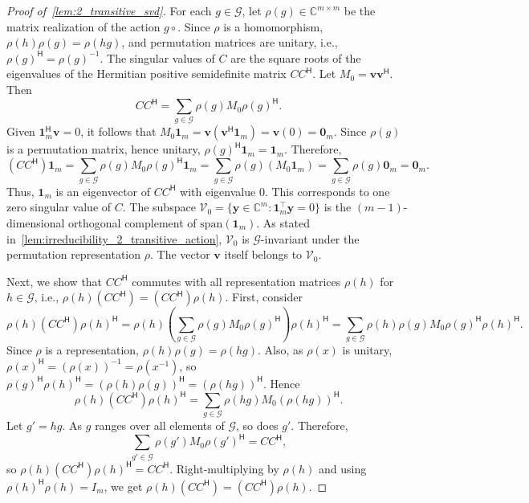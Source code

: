 \documentclass[11pt]{article}
\begin{document}
\begin{proof}[Proof of~\cref{lem:2_transitive_svd}]
For each \(g\in \mathcal G\), let \(\rho(g)\in\mathbb{C}^{m\times m}\) be the matrix realization of the action \(g\circ\). Since \(\rho\) is a homomorphism, \(\rho(h)\rho(g)=\rho(hg)\), and permutation matrices are unitary, i.e., \(\rho(g)^{\mathsf H}=\rho(g)^{-1}\). The singular values of \(C\) are the square roots of the eigenvalues of the Hermitian positive semidefinite matrix \(CC^{\mathsf H}\). Let \(M_0 = \boldsymbol{v}\boldsymbol{v}^{\mathsf H}\). Then
\[
CC^{\mathsf H} = \sum_{g \in \mathcal G} \rho(g) M_0 \rho(g)^{\mathsf H}.
\]
Given \(\boldsymbol{1}_m^{\mathsf H} \boldsymbol{v} = 0\), it follows that \(M_0 \boldsymbol{1}_m = \boldsymbol{v}(\boldsymbol{v}^{\mathsf H} \boldsymbol{1}_m) = \boldsymbol{v}(0) = \boldsymbol{0}_m\). Since \(\rho(g)\) is a permutation matrix, hence unitary, \(\rho(g)^{\mathsf H} \boldsymbol{1}_m = \boldsymbol{1}_m\). Therefore,
\[
(CC^{\mathsf H})\boldsymbol{1}_m
= \sum_{g \in \mathcal G} \rho(g) M_0 \rho(g)^{\mathsf H} \boldsymbol{1}_m
= \sum_{g \in \mathcal G} \rho(g) (M_0 \boldsymbol{1}_m)
= \sum_{g \in \mathcal G} \rho(g)\boldsymbol{0}_m
= \boldsymbol{0}_m.
\]
Thus, \(\boldsymbol{1}_m\) is an eigenvector of \(CC^{\mathsf H}\) with eigenvalue \(0\). This corresponds to one zero singular value of \(C\).
The subspace \(\mathcal V_0 = \{\boldsymbol{y} \in \mathbb{C}^m : \boldsymbol{1}_m^{\top}\boldsymbol{y} = 0\}\) is the \((m-1)\)-dimensional orthogonal complement of \(\mathrm{span}(\boldsymbol{1}_m)\). As stated in~\cref{lem:irreducibility_2_transitive_action}, \(\mathcal V_0\) is \(\mathcal G\)-invariant under the permutation representation \(\rho\). The vector \(\boldsymbol{v}\) itself belongs to \(\mathcal V_0\).

Next, we show that \(CC^{\mathsf H}\) commutes with all representation matrices \(\rho(h)\) for \(h \in \mathcal G\), i.e., \(\rho(h)(CC^{\mathsf H}) = (CC^{\mathsf H})\rho(h)\). First, consider
\[
\rho(h)(CC^{\mathsf H}) \rho(h)^{\mathsf H}
= \rho(h)\left(\sum_{g \in \mathcal G} \rho(g) M_0 \rho(g)^{\mathsf H}\right)\rho(h)^{\mathsf H}
= \sum_{g \in \mathcal G} \rho(h)\rho(g) M_0 \rho(g)^{\mathsf H}\rho(h)^{\mathsf H}.
\]
Since \(\rho\) is a representation, \(\rho(h)\rho(g) = \rho(hg)\). Also, as \(\rho(x)\) is unitary, \(\rho(x)^{\mathsf H} = (\rho(x))^{-1} = \rho(x^{-1})\), so \(\rho(g)^{\mathsf H}\rho(h)^{\mathsf H} = (\rho(h)\rho(g))^{\mathsf H} = (\rho(hg))^{\mathsf H}\). Hence
\[
\rho(h)(CC^{\mathsf H}) \rho(h)^{\mathsf H}
= \sum_{g \in \mathcal G} \rho(hg) M_0 (\rho(hg))^{\mathsf H}.
\]
Let \(g' = hg\). As \(g\) ranges over all elements of \(\mathcal G\), so does \(g'\). Therefore,
\[
\sum_{g' \in \mathcal G} \rho(g') M_0 \rho(g')^{\mathsf H} = CC^{\mathsf H},
\]
so \(\rho(h)(CC^{\mathsf H}) \rho(h)^{\mathsf H} = CC^{\mathsf H}\). Right-multiplying by \(\rho(h)\) and using \(\rho(h)^{\mathsf H}\rho(h)=I_m\), we get \(\rho(h)(CC^{\mathsf H}) = (CC^{\mathsf H})\rho(h)\).


\end{proof}
\end{document}
